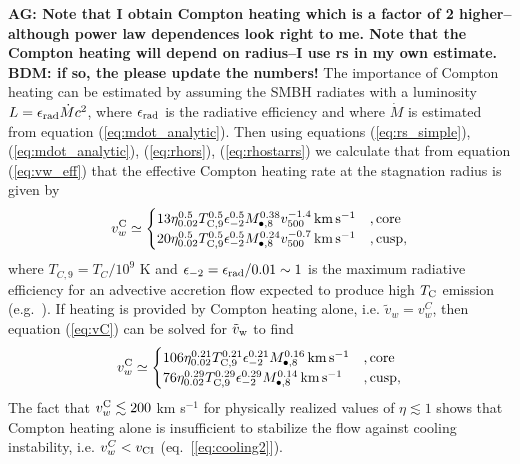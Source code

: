 \documentclass[usenatbib,fleqn]{mn2e}
\begin{document}
{\bf AG: Note that I obtain Compton heating which is a factor of 2
  higher--although power law dependences look right to me. Note that
  the Compton heating will depend on radius--I use rs in my own
  estimate.  BDM: if so, the please update the numbers!  }
The importance of Compton heating can be estimated by assuming the SMBH
radiates with a luminosity $L = \epsilon_{\rm rad} \dot{M}c^{2}$, where
$\epsilon_{\rm rad}$ is the radiative efficiency and where $\dot{M}$ is
estimated from equation (\ref{eq:mdot_analytic}).  Then using
equations (\ref{eq:rs_simple}), (\ref{eq:mdot_analytic}),
(\ref{eq:rhors}), (\ref{eq:rhostarrs}) we calculate that from equation
(\ref{eq:vw_eff}) that the effective Compton heating rate at the stagnation radius is given by
\begin{align} v_{w}^{\rm C} \simeq
  \begin{cases} 13 \eta_{0.02}^{0.5}T_{\rm
C,9}^{0.5}\epsilon_{-2}^{0.5} M_{\bullet,8}^{0.38}v_{500}^{-1.4}\,{\rm
km\,s^{-1}} &, \text{core}\\ 20 \eta_{0.02}^{0.5}T_{\rm
C,9}^{0.5}\epsilon_{-2}^{0.5} M_{\bullet,8}^{0.24}v_{500}^{-0.7}\,{\rm
km\,s^{-1}} &, \text{cusp},
  \end{cases}
  \label{eq:vC}
\end{align} where $T_{C,9} = T_{C}/10^{9}$ K and $\epsilon_{-2} =
\epsilon_{\rm rad}/0.01 \sim 1$ is the maximum radiative efficiency for an advective
accretion flow expected to produce high $T_{\rm C}$ emission (e.g.~\citealt{Narayan&Yi95}).  If heating is provided by Compton heating alone, i.e. $\tilde{v}_{w} = v_{w}^{C}$, then equation (\ref{eq:vC}) can be solved for $\tilde{v}_{\rm w}$ to find
\begin{align} v_{w}^{\rm C} \simeq
  \begin{cases} 106 \eta_{0.02}^{0.21}T_{\rm
C,9}^{0.21}\epsilon_{-2}^{0.21} M_{\bullet,8}^{0.16}\,{\rm km\,s^{-1}}
&, \text{core}\\ 76 \eta_{0.02}^{0.29}T_{\rm
C,9}^{0.29}\epsilon_{-2}^{0.29} M_{\bullet,8}^{0.14}\,{\rm km\,s^{-1}}
&, \text{cusp},
  \end{cases}
  \label{eq:vC2}
\end{align} 
The fact that $v_{w}^{\rm C} \lesssim 200$ km s$^{-1}$ for physically realized values of $\eta \lesssim 1$ shows that Compton heating alone is insufficient to stabilize the flow against cooling
instability, i.e. $v_{w}^{C} < v_{\rm CI}$ (eq.~[\ref{eq:cooling2}]).
\end{document}
